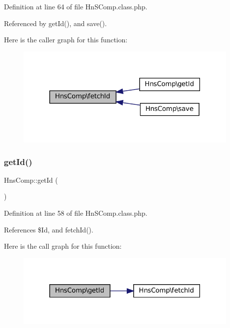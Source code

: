 Definition at line 64 of file Hn\+S\+Comp.\+class.\+php.



Referenced by get\+Id(), and save().

Here is the caller graph for this function\+:\nopagebreak
\begin{figure}[H]
\begin{center}
\leavevmode
\includegraphics[width=309pt]{class_hns_comp_aa81a8b1cb6f2ca42b2d39beeb3d36f0d_icgraph}
\end{center}
\end{figure}
\mbox{\label{class_hns_comp_a80efbbc0b92788ed743e316f8302f341}} 
\subsubsection{\texorpdfstring{get\+Id()}{getId()}}
{\footnotesize\ttfamily Hns\+Comp\+::get\+Id (\begin{DoxyParamCaption}{ }\end{DoxyParamCaption})}



Definition at line 58 of file Hn\+S\+Comp.\+class.\+php.



References \$\+Id, and fetch\+Id().

Here is the call graph for this function\+:\nopagebreak
\begin{figure}[H]
\begin{center}
\leavevmode
\includegraphics[width=309pt]{class_hns_comp_a80efbbc0b92788ed743e316f8302f341_cgraph}
\end{center}
\end{figure}
\mbox{\label{class_hns_comp_a72dab504bf9f274ff6d86eedaab8bab3}} 

